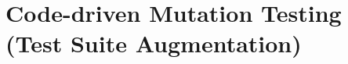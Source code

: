\clearpage
\section{Code-driven Mutation Testing (Test Suite Augmentation)}
\label{sec:testGeneration:codeDriven}




